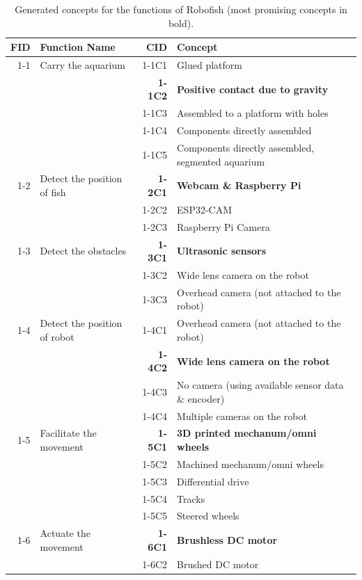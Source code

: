 \documentclass[a4paper, 10pt, DIV=16, parskip = full, twocolumn = true]{scrartcl}
\begin{document}

\begin{table}
\centering
\caption{Generated concepts for the functions of Robofish (most promising concepts in bold).}
	\begin{tabular}{rlrl}
	\toprule
		FID & Function Name & CID & Concept \\
	\midrule
		1-1 & Carry the aquarium & 1-1C1 & Glued platform \\	
	 	& & \textbf{1-1C2} & \textbf{Positive contact due to gravity} \\	
		& & 1-1C3 & Assembled to a platform with holes \\	
		& & 1-1C4 & Components directly assembled \\	
		& & 1-1C5 & Components directly assembled, segmented aquarium \\	
		1-2 & Detect the position of fish & \textbf{1-2C1} & \textbf{Webcam \& Raspberry Pi} \\
		& & 1-2C2 & ESP32-CAM \\	
		& & 1-2C3 & Raspberry Pi Camera \\	
		1-3 & Detect the obstacles & \textbf{1-3C1} & \textbf{Ultrasonic sensors} \\
		& & 1-3C2 & Wide lens camera on the robot \\	
		& & 1-3C3 & Overhead camera (not attached to the robot) \\
		1-4 & Detect the position of robot & 1-4C1 & Overhead camera (not attached to the robot) \\	 
		& & \textbf{1-4C2} & \textbf{Wide lens camera on the robot} \\
		& & 1-4C3 & No camera (using available sensor data \& encoder) \\
		& & 1-4C4 & Multiple cameras on the robot \\
		1-5 & Facilitate the movement & \textbf{1-5C1} & \textbf{3D printed mechanum/omni wheels} \\
		& & 1-5C2 & Machined mechanum/omni wheels \\	
		& & 1-5C3 & Differential drive \\
		& & 1-5C4 & Tracks \\	
		& & 1-5C5 & Steered wheels \\
		1-6 & Actuate the movement & \textbf{1-6C1} & \textbf{Brushless DC motor} \\
		& & 1-6C2 & Brushed DC motor \\	

\end{tabular}
\end{table}
\end{document}
